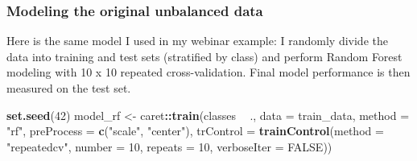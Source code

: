 \documentclass[]{book}
\newenvironment{Shaded}{\begin{snugshade}}{\end{snugshade}}
\newcommand{\DataTypeTok}[1]{\textcolor[rgb]{0.13,0.29,0.53}{#1}}
\newcommand{\DecValTok}[1]{\textcolor[rgb]{0.00,0.00,0.81}{#1}}
\newcommand{\FloatTok}[1]{\textcolor[rgb]{0.00,0.00,0.81}{#1}}
\newcommand{\KeywordTok}[1]{\textcolor[rgb]{0.13,0.29,0.53}{\textbf{#1}}}
\newcommand{\NormalTok}[1]{#1}
\newcommand{\OperatorTok}[1]{\textcolor[rgb]{0.81,0.36,0.00}{\textbf{#1}}}
\newcommand{\OtherTok}[1]{\textcolor[rgb]{0.56,0.35,0.01}{#1}}
\newcommand{\StringTok}[1]{\textcolor[rgb]{0.31,0.60,0.02}{#1}}
\begin{document}
\hypertarget{modeling-the-original-unbalanced-data}{%
\subsubsection{Modeling the original unbalanced data}\label{modeling-the-original-unbalanced-data}}

Here is the same model I used in my webinar example: I randomly divide the data into training and test sets (stratified by class) and perform Random Forest modeling with 10 x 10 repeated cross-validation. Final model performance is then measured on the test set.

\begin{Shaded}
\end{Shaded}

\begin{Shaded}
\begin{Highlighting}[]
\KeywordTok{set.seed}\NormalTok{(}\DecValTok{42}\NormalTok{)}
\NormalTok{model_rf <-}\StringTok{ }\NormalTok{caret}\OperatorTok{::}\KeywordTok{train}\NormalTok{(classes }\OperatorTok{~}\StringTok{ }\NormalTok{.,}
                         \DataTypeTok{data =}\NormalTok{ train_data,}
                         \DataTypeTok{method =} \StringTok{"rf"}\NormalTok{,}
                         \DataTypeTok{preProcess =} \KeywordTok{c}\NormalTok{(}\StringTok{"scale"}\NormalTok{, }\StringTok{"center"}\NormalTok{),}
                         \DataTypeTok{trControl =} \KeywordTok{trainControl}\NormalTok{(}\DataTypeTok{method =} \StringTok{"repeatedcv"}\NormalTok{, }
                                                  \DataTypeTok{number =} \DecValTok{10}\NormalTok{, }
                                                  \DataTypeTok{repeats =} \DecValTok{10}\NormalTok{, }
                                                  \DataTypeTok{verboseIter =} \OtherTok{FALSE}\NormalTok{))}
\end{Highlighting}
\end{Shaded}
\end{document}
